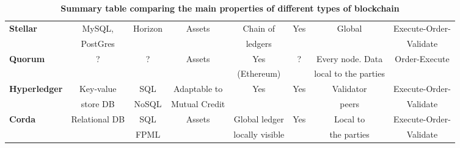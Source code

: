 \begin{table}
\begin{centering}
{\begin{tabular}{| l | c | c | c | c | c | c | c |}
\textbf{Stellar}		&MySQL,		&Horizon			&Assets
				&Chain of		&Yes				&Global			&Execute-Order-\\
				&PostGres	&				&
				&ledgers		&				&				&Validate\\
\hline
\textbf{Quorum} 	&?			&?				&Assets
				&Yes			&?				&Every node. Data	&Order-Execute\\
			 	&			&				&
				&(Ethereum) 	&				&local to the parties		& \\
\hline
\textbf{Hyperledger}	&Key-value	&SQL			&Adaptable to
				&Yes			&Yes				&Validator				&Execute-Order-\\
 				&store DB		&NoSQL			&Mutual Credit
				&			&				&peers				&Validate \\
\hline
\textbf{Corda} 		&Relational DB	&SQL			&Assets
				&Global ledger	&Yes				&Local to				&Execute-Order-\\
		 		&			&FPML			&
				&locally visible 	&				&the parties			&Validate \\
\hline
\end{tabular}}
\caption{\bf \small Summary table comparing the main properties of different types of blockchain}
\label{blockchain_types1}
\end{centering}
\end{table}


